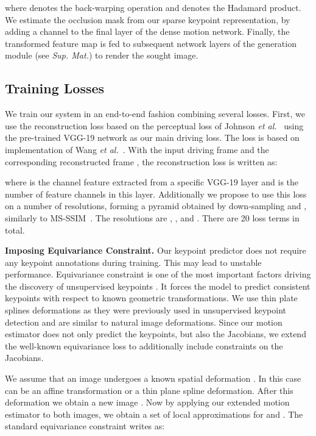 \documentclass{article}
\def\etal{\textit{et al.}}
\begin{document}
where  denotes the back-warping operation and  denotes the Hadamard product. We estimate the occlusion mask from our sparse keypoint representation, by adding a channel to the final layer of the dense motion network. Finally, the transformed feature map  is fed to subsequent network layers of the generation module (see \emph{Sup. Mat.}) to render the sought image.
\subsection{Training Losses}

We train our system in an end-to-end fashion combining several losses. First, we use the reconstruction loss based on the perceptual loss of Johnson \etal~\cite{johnson2016perceptual} using the pre-trained VGG-19 network as our main driving loss. The loss is based on implementation of Wang \etal ~\cite{wang2018video}. 
With the input driving frame  and the corresponding reconstructed frame , the reconstruction loss is written as:

where  is the  channel feature extracted from a specific VGG-19 layer and  is the number of feature channels in this layer. Additionally we propose to use this loss on a number of resolutions, forming a pyramid obtained by down-sampling  and , similarly to MS-SSIM~\cite{wang2003multiscale, tang2018dual}. The resolutions are , ,  and . There are 20 loss terms in total.


\textbf{Imposing Equivariance Constraint.} Our keypoint predictor does not require any keypoint annotations during training. This may lead to unstable performance. Equivariance constraint is one of the most important factors driving the discovery of unsupervised keypoints \cite{jakabunsupervised,Zhang_2018_CVPR}. It forces the model to predict consistent keypoints with respect to known geometric transformations. We use thin plate splines deformations as they were previously used in unsupervised keypoint detection \cite{jakabunsupervised,Zhang_2018_CVPR} and are similar to natural image deformations. Since our motion estimator does not only predict the keypoints, but also the Jacobians, we extend the well-known equivariance loss to additionally include constraints on the Jacobians. 

We assume that an image  undergoes a known spatial deformation . In this case  can be an affine transformation or a thin plane spline deformation. After this deformation we obtain a new image . Now by applying our extended motion estimator to both images, we obtain a set of local approximations for  and . The standard equivariance constraint writes as: 
\end{document}
